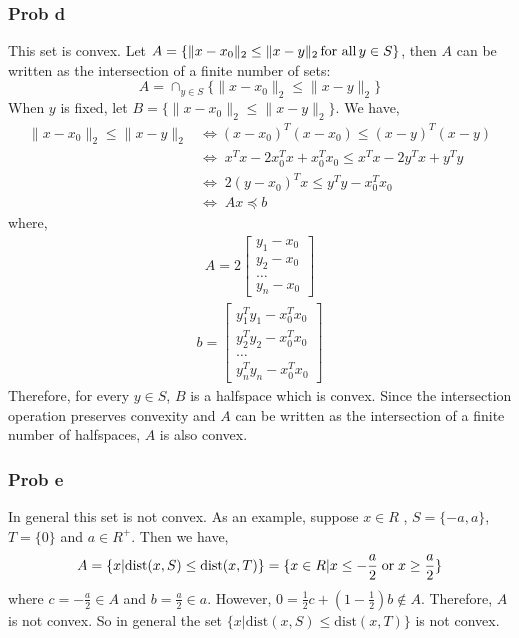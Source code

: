 \documentclass[10pt,a4paper]{article}
\begin{document}
\subsubsection{Prob d}
This set is convex. Let $A = \{\|x-x_0\|_2 \leq \|x-y\|_2 \text{\,for all\,} y \in S\}$, then $A$ can be written as the intersection of a finite number of sets:
$$
A = \cap_{y\in S}\{\|x-x_0\|_2 \leq \|x-y\|_2\}
$$
When $y$ is fixed, let $B=\{\|x-x_0\|_2 \leq \|x-y\|_2\}$. We have,
\begin{align*}
	\|x-x_0\|_2 \leq \|x-y\|_2&\Longleftrightarrow(x-x_0)^T(x-x_0)\leq(x-y)^T(x-y)\\
	&\Longleftrightarrow\; x^Tx-2x_0^Tx+x_0^Tx_0\leq x^Tx-2y^Tx+y^Ty\\
	&\Longleftrightarrow\; 2(y-x_0)^Tx\leq y^Ty-x_0^Tx_0\\
	&\Longleftrightarrow\; Ax\preceq b
\end{align*}
where,
\begin{align*}
	A=2
	\begin{bmatrix}
	y_1-x_0\\
	y_2-x_0\\
	\dots\\
	y_n-x_0
	\end{bmatrix}
\end{align*}
\begin{align*}
b=
\begin{bmatrix}
y_1^Ty_1-x_0^Tx_0\\
y_2^Ty_2-x_0^Tx_0\\
\dots\\
y_n^Ty_n-x_0^Tx_0
\end{bmatrix}
\end{align*}
Therefore, for every $y \in S$, $B$ is a halfspace which is convex. Since the intersection operation preserves convexity and $A$ can be written as the intersection of a finite number of halfspaces, $A$ is also convex.

\subsubsection{Prob e}
In general this set is not convex. As an example, suppose $ x\in R$ , $S=\{-a,a\}$, $T=\{0\}$ and $a\in R^+$. Then we have,
$$
A=\{x|\text{dist}(x,S)\leq \text{dist}(x,T)\} = \{x\in R|x\leq -\frac{a}{2} \text{\;or\;} x \geq \frac{a}{2}\}
$$
where $c= -\frac{a}{2} \in A$ and $b= \frac{a}{2} \in a$. However, $0=\frac{1}{2}c+(1-\frac{1}{2})b\notin A$. Therefore, $A$ is not convex. So in general the set $\{x|\text{dist}(x,S)\leq \text{dist}(x,T)\} $ is not convex.
\end{document}
